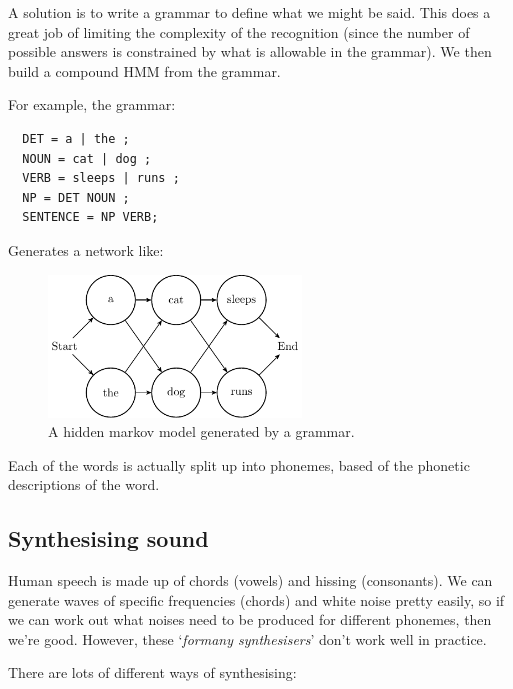 A solution is to write a grammar to define what we might be said. This does a
great job of limiting the complexity of the recognition (since the number of
possible answers is constrained by what is allowable in the grammar). We then
build a compound HMM from the grammar.

For example, the grammar:

\begin{verbatim}
  DET = a | the ;
  NOUN = cat | dog ;
  VERB = sleeps | runs ;
  NP = DET NOUN ;
  SENTENCE = NP VERB;
\end{verbatim}

Generates a network like:

\begin{figure}[H]
  \centering
  \includegraphics[width=0.6\textwidth]{diagrams/generated-hmm}
  \caption{A hidden markov model generated by a grammar.}
  \label{fig:gen-hmm}
\end{figure}

Each of the words is actually split up into phonemes, based of the phonetic
descriptions of the word.

\subsection{Synthesising sound}

Human speech is made up of chords (vowels) and hissing (consonants). We can
generate waves of specific frequencies (chords) and white noise pretty easily,
so if we can work out what noises need to be produced for different phonemes,
then we're good. However, these `\textit{formany synthesisers}' don't work well
in practice.

There are lots of different ways of synthesising:


